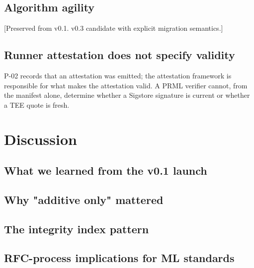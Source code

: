 \documentclass[11pt, a4paper]{article}
\begin{document}
\subsection{Algorithm agility}

[Preserved from v0.1. v0.3 candidate with explicit migration semantics.]

\subsection{Runner attestation does not specify validity}

P-02 records that an attestation was emitted; the attestation framework is responsible for what makes the attestation valid. A PRML verifier cannot, from the manifest alone, determine whether a Sigstore signature is current or whether a TEE quote is fresh.

\section{Discussion}
\label{sec:discussion}

\subsection{What we learned from the v0.1 launch}


\subsection{Why "additive only" mattered}


\subsection{The integrity index pattern}


\subsection{RFC-process implications for ML standards}

\end{document}
